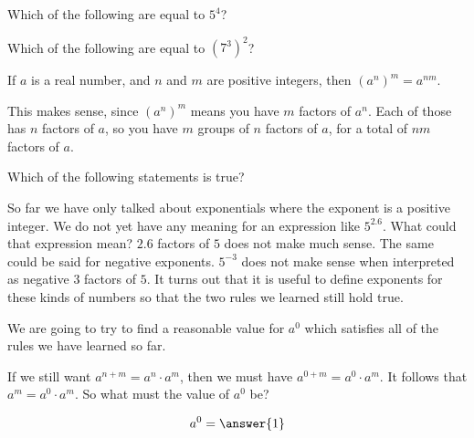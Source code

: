\documentclass{ximera}
\begin{document}
\begin{question}
	Which of the following are equal to $5^4$?
	\begin{selectAll}
	\end{selectAll}
\end{question}

\begin{question}
	Which of the following are equal to $(7^3)^2$?
	\begin{selectAll}
		\choice{$7^5$}
		\choice[correct]{$(7^3) \cdot (7^3)$}
		\choice{$7^6$}
		\choice{$7\cdot 7 \cdot 7 \cdot 7 \cdot 7$}
	\end{selectAll}
\end{question}

\begin{theorem}
	If $a$ is a real number, and $n$ and $m$ are positive integers, then $(a^n)^m = a^{nm}$.
\end{theorem}



This makes sense, since $(a^n)^m$ means you have $m$ factors of $a^n$.  Each of those has $n$ factors of $a$, so you have $m$ groups of $n$ factors of $a$, for a total of $nm$ factors of $a$.

\begin{question}
	Which of the following statements is true?
	\begin{multipleChoice}
	\end{multipleChoice}
\end{question}

So far we have only talked about exponentials where the exponent is a positive integer.  We do not yet have any meaning for an expression like $5^{2.6}$.  What could that expression mean?  $2.6$ factors of $5$ does not make much sense.  The same could be said for negative exponents.  $5^{-3}$ does not make sense when interpreted as negative $3$ factors of $5$.  It turns out that it is useful to define exponents for these kinds of numbers so that the two rules we learned still hold true.

\begin{question}
	We are going to try to find a reasonable value for $a^0$ which satisfies all of the rules we have learned so far.
	
If we still want $a^{n+m} = a^n \cdot a^m$, then we must have $a^{0+m} = a^0\cdot a^m$.  It follows that $a^m = a^0 \cdot a^m$.  So what must the value of $a^0$ be?

\[a^0 = \answer{1}\]

\end{question}
\end{document}

